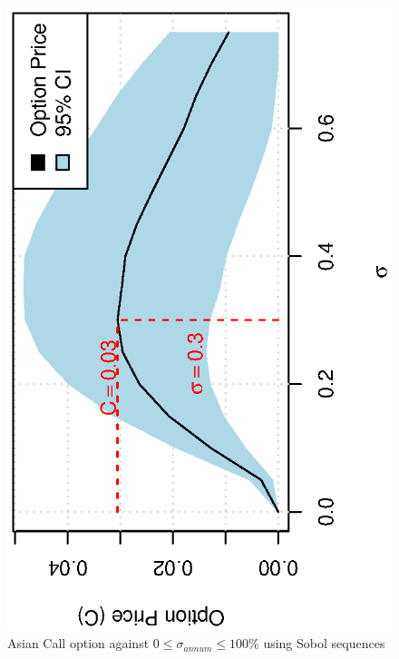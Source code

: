 \documentclass[12pt,a4paper]{article}
\begin{document}
\begin{figure}[!ht]
  \centering
  \includegraphics[scale=0.85,angle=-90]{./images/sobol/priceOptionSigma75.eps}
  \caption{Asian Call option against $0\leq \sigma_{annum} \leq 100
    \%$ using Sobol sequences}
  \label{fig:sigma_brackets-sobol}
\end{figure}
\end{document}
